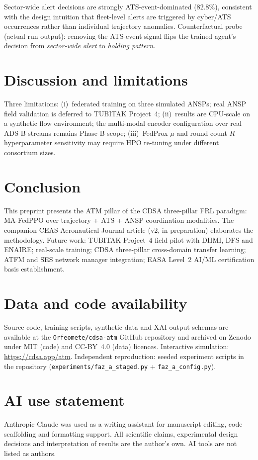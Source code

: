 \documentclass[11pt]{article}
\begin{document}
Sector-wide alert decisions are strongly ATS-event-dominated (82.8\%), consistent with the design intuition that fleet-level alerts are triggered by cyber/ATS occurrences rather than individual trajectory anomalies. Counterfactual probe (actual run output): removing the ATS-event signal flips the trained agent's decision from \emph{sector-wide alert} to \emph{holding pattern}.

\section{Discussion and limitations}
Three limitations: (i)~federated training on three simulated ANSPs; real ANSP field validation is deferred to TUBITAK Project~4; (ii)~results are CPU-scale on a synthetic flow environment; the multi-modal encoder configuration over real ADS-B streams remains Phase-B scope; (iii)~FedProx $\mu$ and round count $R$ hyperparameter sensitivity may require HPO re-tuning under different consortium sizes.

\section{Conclusion}
This preprint presents the ATM pillar of the CDSA three-pillar FRL paradigm: MA-FedPPO over trajectory + ATS + ANSP coordination modalities. The companion CEAS Aeronautical Journal article (v2, in preparation) elaborates the methodology. Future work: TUBITAK Project~4 field pilot with DHMI, DFS and ENAIRE; real-scale training; CDSA three-pillar cross-domain transfer learning; ATFM and SES network manager integration; EASA Level~2 AI/ML certification basis establishment.

\section*{Data and code availability}
Source code, training scripts, synthetic data and XAI output schemas are available at the \texttt{Orfeomete/cdsa-atm} GitHub repository and archived on Zenodo under MIT (code) and CC-BY~4.0 (data) licences. Interactive simulation: \url{https://cdsa.app/atm}. Independent reproduction: seeded experiment scripts in the repository (\texttt{experiments/faz\_a\_staged.py} + \texttt{faz\_a\_config.py}).

\section*{AI use statement}
Anthropic Claude was used as a writing assistant for manuscript editing, code scaffolding and formatting support. All scientific claims, experimental design decisions and interpretation of results are the author's own. AI tools are not listed as authors.
\end{document}
